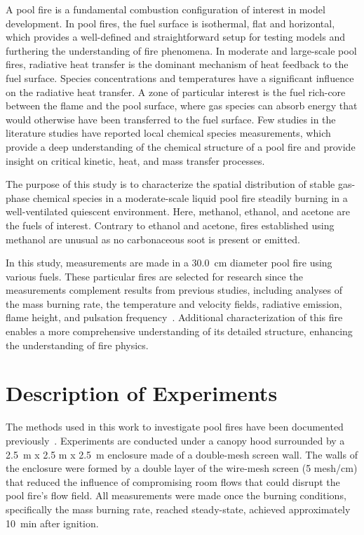 \documentclass[12pt]{article}
\begin{document}
A pool fire is a fundamental combustion configuration of interest in model development. In pool fires, the fuel surface is isothermal, flat and horizontal, which provides a well-defined and straightforward setup for testing models and furthering the understanding of fire phenomena. In moderate and large-scale pool fires, radiative heat transfer is the dominant mechanism of heat feedback to the fuel surface. Species concentrations and temperatures have a significant influence on the radiative heat transfer. A zone of particular interest is the fuel rich-core between the flame and the pool surface, where gas species can absorb energy that would otherwise have been transferred to the fuel surface. Few studies in the literature studies have reported local chemical species measurements, which provide a deep understanding of the chemical structure of a pool fire and provide insight on critical kinetic, heat, and mass transfer processes.

The purpose of this study is to characterize the spatial distribution of stable gas-phase chemical species in a moderate-scale liquid pool fire steadily burning in a well-ventilated quiescent environment. Here, methanol, ethanol, and acetone are the fuels of interest. Contrary to ethanol and acetone, fires established using methanol are unusual as no carbonaceous soot is present or emitted.

In this study, measurements are made in a 30.0~\si{cm} diameter pool fire using various fuels. These particular fires are selected for research since the measurements complement results from previous studies, including analyses of the mass burning rate, the temperature and velocity fields, radiative emission, flame height, and pulsation frequency~\cite{Fisher1987,Hamins2016}. Additional characterization of this fire enables a more comprehensive understanding of its detailed structure, enhancing the understanding of fire physics.
\section{Description of Experiments}
\label{sec:Experiments}

The methods used in this work to investigate pool fires have been documented previously~\cite{Hamins2016,Hamins1994,Hamins1991,Hamins1996,Lock2008}. Experiments are conducted under a canopy hood surrounded by a 2.5~\si{m} x 2.5 \si{m} x 2.5~\si{m} enclosure made of a double-mesh screen wall. The walls of the enclosure were formed by a double layer of the wire-mesh screen (5 mesh/cm) that reduced the influence of compromising room flows that could disrupt the pool fire’s flow field. All measurements were made once the burning conditions, specifically the mass burning rate, reached steady-state, achieved approximately 10~\si{min} after ignition.
\end{document}
